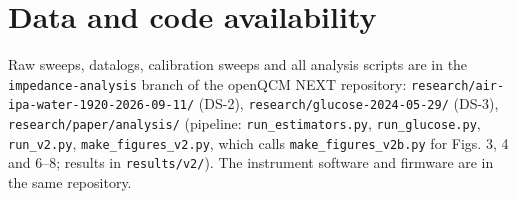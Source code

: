\documentclass[11pt,a4paper]{article}
\begin{document}
\section*{Data and code availability}

Raw sweeps, datalogs, calibration sweeps and all analysis scripts are in the \texttt{impedance-analysis} branch of the openQCM NEXT repository: \texttt{research/air-ipa-water-1920-2026-09-11/} (DS-2), \texttt{research/glucose-2024-05-29/} (DS-3), \texttt{research/paper/analysis/} (pipeline: \texttt{run\_estimators.py}, \texttt{run\_glucose.py}, \texttt{run\_v2.py}, \texttt{make\_figures\_v2.py}, which calls \texttt{make\_figures\_v2b.py} for Figs. 3, 4 and 6--8; results in \texttt{results/v2/}). The instrument software and firmware are in the same repository.



\end{document}
